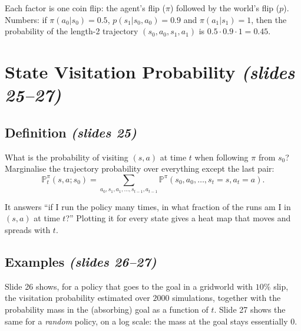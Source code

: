 \documentclass[11pt,a4paper]{article}
\newcommand{\PP}{\mathbb{P}}
\newcommand{\slr}[1]{\texorpdfstring{\emph{(slides #1)}}{(slides #1)}}
\theoremstyle{plain}
\theoremstyle{definition}
\theoremstyle{remark}
\begin{document}
\begin{intuition}
Each factor is one coin flip: the agent's flip ($\pi$) followed by the world's flip ($p$). Numbers: if $\pi(a_0|s_0)=0.5$, $p(s_1|s_0,a_0)=0.9$ and $\pi(a_1|s_1)=1$, then the probability of the length-2 trajectory $(s_0,a_0,s_1,a_1)$ is $0.5\cdot0.9\cdot1=0.45$.
\end{intuition}

\section{State Visitation Probability \slr{25--27}}
\subsection{Definition \slr{25}}
What is the probability of visiting $(s,a)$ at time $t$ when following $\pi$ from $s_0$? Marginalise the trajectory probability over everything except the last pair:
\[
  \PP^\pi_t(s,a;s_0)=\sum_{a_0,s_1,a_1,\dots,s_{t-1},a_{t-1}}\PP^\pi(s_0,a_0,\dots,s_t=s,a_t=a).
\]

\begin{intuition}
It answers ``if I run the policy many times, in what fraction of the runs am I in $(s,a)$ at time $t$?'' Plotting it for every state gives a heat map that moves and spreads with $t$.
\end{intuition}

\subsection{Examples \slr{26--27}}
Slide 26 shows, for a policy that goes to the goal in a gridworld with $10\%$ slip, the visitation probability estimated over $2000$ simulations, together with the probability mass in the (absorbing) goal as a function of $t$. Slide 27 shows the same for a \emph{random} policy, on a log scale: the mass at the goal stays essentially $0$.
\end{document}
